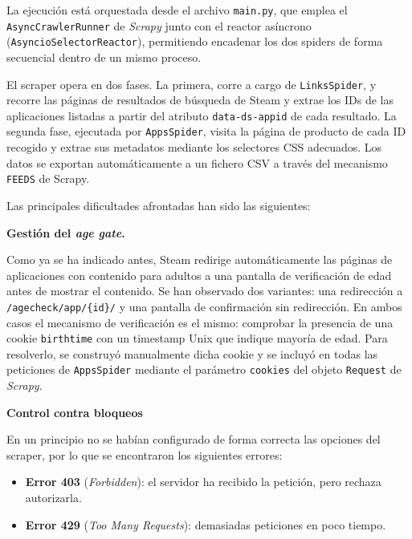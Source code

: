 \documentclass[
]{article}
\begin{document}
La ejecución está orquestada desde el archivo \texttt{main.py}, que emplea el \texttt{AsyncCrawlerRunner} de \textit{Scrapy} junto con el reactor asíncrono (\texttt{AsyncioSelectorReactor}), permitiendo encadenar los dos spiders de forma secuencial dentro de un mismo proceso.

El scraper opera en dos fases. La primera, corre a cargo de \texttt{LinksSpider}, y recorre las páginas de resultados de búsqueda de Steam y extrae los IDs de las aplicaciones listadas a partir del atributo \texttt{data-ds-appid} de cada resultado. La segunda fase, ejecutada por \texttt{AppsSpider}, visita la página de producto de cada ID recogido y extrae sus metadatos mediante los selectores CSS adecuados. Los datos se exportan automáticamente a un fichero CSV a través del mecanismo \texttt{FEEDS} de Scrapy.

\vspace{0.2cm}
Las principales dificultades afrontadas han sido las siguientes:

\vspace{0.2cm}
\textbf{Gestión del \textit{age gate}.}

Como ya se ha indicado antes, Steam redirige automáticamente las páginas de aplicaciones con contenido para adultos a una pantalla de verificación de edad antes de mostrar el contenido. Se han observado dos variantes: una redirección a \texttt{/agecheck/app/\{id\}/} y una pantalla de confirmación sin redirección. En ambos casos el mecanismo de verificación es el mismo: comprobar la presencia de una cookie \texttt{birthtime} con un timestamp Unix que indique mayoría de edad. Para resolverlo, se construyó manualmente dicha cookie y se incluyó en todas las peticiones de \texttt{AppsSpider} mediante el parámetro \texttt{cookies} del objeto \texttt{Request} de \textit{Scrapy}.

\vspace{0.2cm}
\textbf{Control contra bloqueos}

En un principio no se habían configurado de forma correcta las opciones del scraper, por lo que se encontraron los siguientes errores:

\begin{itemize}[itemsep=-4pt]
  \item \textbf{Error 403} (\textit{Forbidden}): el servidor ha recibido la petición, pero rechaza autorizarla.
  \item \textbf{Error 429} (\textit{Too Many Requests}): demasiadas peticiones en poco tiempo.
\end{itemize}
\end{document}

